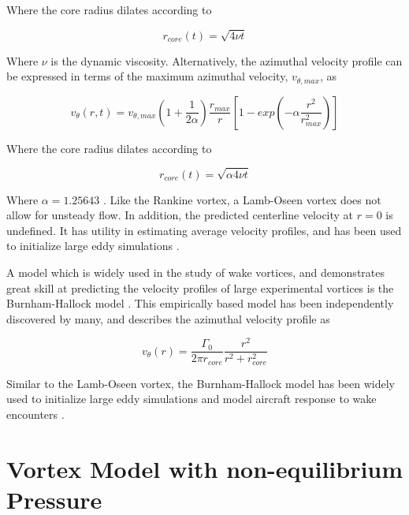 \noindent
Where the core radius dilates according to 

\begin{equation}
r_{core}(t) = \sqrt{4 \nu t}
	\label{eq:lamb2}
\end{equation}

\noindent
Where $\nu$ is the dynamic viscosity. Alternatively, the azimuthal velocity 
profile can be expressed in terms of the maximum azimuthal velocity, 
$v_{\theta, max}$, as

\begin{equation}
v_{\theta}(r,t) = v_{\theta, max} (1 + \frac{1}{2 \alpha}) \frac{r_{max}}{r} 
[1 - exp(- \alpha \frac{r^2}{r_{max}^2})]
\label{eq:lamb3}
\end{equation}

\noindent
Where the core radius dilates according to 

\begin{equation}
r_{core}(t) = \sqrt{\alpha 4 \nu t}
\label{eq:lamb4}
\end{equation}

\noindent
Where $\alpha = 1.25643$ \cite{davenport1996}. Like the Rankine vortex, a 
Lamb-Oseen vortex does not allow for unsteady flow. In addition, the predicted 
centerline velocity at $r=0$ is undefined. It has utility in estimating average 
velocity profiles, and has been used to initialize large eddy 
simulations \cite{hennemann2011}.

A model which is widely used in the study of wake vortices, and demonstrates 
great skill at predicting the velocity profiles of large experimental vortices 
is the Burnham-Hallock model \cite{burnham1982}. This empirically based model 
has been independently discovered by many, and describes the 
azimuthal velocity profile as

\begin{equation}
v_{\theta}(r) = \frac{\Gamma_0}{2 \pi r_{core}} \frac{r^2}{r^2 + r_{core}^2}
\label{eq:burnham-hallock}
\end{equation}

\noindent
Similar to the Lamb-Oseen vortex, the Burnham-Hallock model has been widely 
used to initialize large eddy simulations and model aircraft response to wake 
encounters \cite{ahmad2014}.

\section{Vortex Model with non-equilibrium Pressure}


